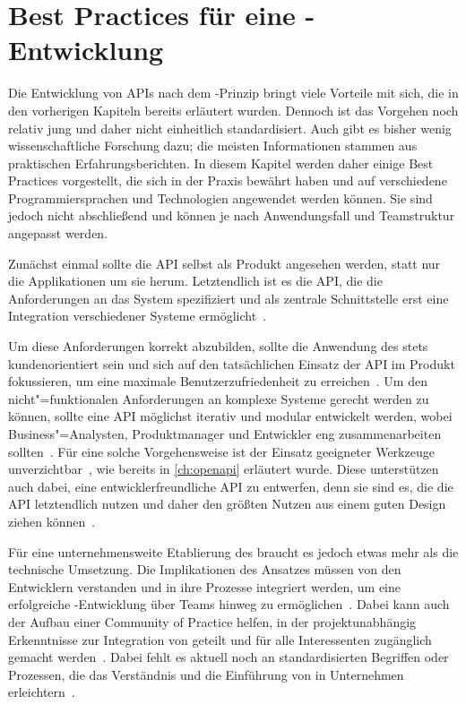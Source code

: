 \chapter{Best Practices für eine \AF-Entwicklung}
Die Entwicklung von \acp{API} nach dem \AF-Prinzip bringt viele Vorteile mit sich, die in den vorherigen Kapiteln bereits erläutert wurden.
Dennoch ist das Vorgehen noch relativ jung und daher nicht einheitlich standardisiert.
Auch gibt es bisher wenig wissenschaftliche Forschung dazu; die meisten Informationen stammen aus praktischen Erfahrungsberichten.
In diesem Kapitel werden daher einige Best Practices vorgestellt, die sich in der Praxis bewährt haben und auf verschiedene Programmiersprachen und Technologien angewendet werden können.
Sie sind jedoch nicht abschließend und können je nach Anwendungsfall und Teamstruktur angepasst werden.

Zunächst einmal sollte die \ac{API} selbst als Produkt angesehen werden, statt nur die Applikationen um sie herum.
Letztendlich ist es die \ac{API}, die die Anforderungen an das System spezifiziert und als zentrale Schnittstelle erst eine Integration verschiedener Systeme ermöglicht~\cite[350]{de23}.

Um diese Anforderungen korrekt abzubilden, sollte die Anwendung des \AFAes stets kundenorientiert sein und sich auf den tatsächlichen Einsatz der \ac{API} im Produkt fokussieren, um eine maximale Benutzerzufriedenheit zu erreichen~\cite[1627]{cha21}.
Um den nicht"=funktionalen Anforderungen an komplexe Systeme gerecht werden zu können, sollte eine \ac{API} möglichst iterativ und modular entwickelt werden, wobei Business"=Analysten, Produktmanager und Entwickler eng zusammenarbeiten sollten~\cite[352]{de23}.
Für eine solche Vorgehensweise ist der Einsatz geeigneter Werkzeuge unverzichtbar~\cite[1628]{cha21}, wie bereits in \autoref{ch:openapi} erläutert wurde.
Diese unterstützen auch dabei, eine entwicklerfreundliche \ac{API} zu entwerfen, denn sie sind es, die die \ac{API} letztendlich nutzen und daher den größten Nutzen aus einem guten Design ziehen können~\cite[355]{de23}.

Für eine unternehmensweite Etablierung des \AFAes braucht es jedoch etwas mehr als die technische Umsetzung.
Die Implikationen des Ansatzes müssen von den Entwicklern verstanden und in ihre Prozesse integriert werden, um eine erfolgreiche \AF-Entwicklung über Teams hinweg zu ermöglichen~\cite[359]{de23}.
Dabei kann auch der Aufbau einer Community of Practice helfen, in der projektunabhängig Erkenntnisse zur Integration von \AF geteilt und für alle Interessenten zugänglich gemacht werden~\cite[4]{kul23}.
Dabei fehlt es aktuell noch an standardisierten Begriffen oder Prozessen, die das Verständnis und die Einführung von \AF in Unternehmen erleichtern~\cites[77]{bea22}[2]{kul23}.

